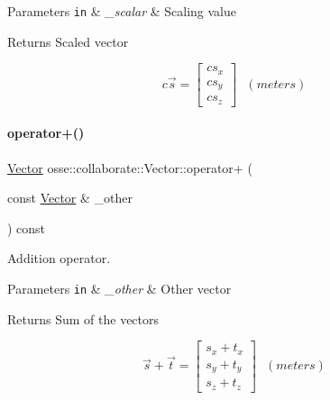 \begin{DoxyParams}[1]{Parameters}
\mbox{\tt in}  & {\em \+\_\+scalar} & Scaling value \\
\hline
\end{DoxyParams}
\begin{DoxyReturn}{Returns}
Scaled vector
\end{DoxyReturn}
\[ c\vec{s}=\begin{bmatrix}c s_x\\c s_y\\c s_z\end{bmatrix}~~~(meters) \] \mbox{\label{classosse_1_1collaborate_1_1_vector_aab7a37d0c9d6af906635510b15063cac}} 
\paragraph{\texorpdfstring{operator+()}{operator+()}}
{\footnotesize\ttfamily \hyperlink{classosse_1_1collaborate_1_1_vector}{Vector} osse\+::collaborate\+::\+Vector\+::operator+ (\begin{DoxyParamCaption}\item[{const \hyperlink{classosse_1_1collaborate_1_1_vector}{Vector} \&}]{\+\_\+other }\end{DoxyParamCaption}) const\hspace{0.3cm}{\ttfamily [inline]}}



Addition operator. 


\begin{DoxyParams}[1]{Parameters}
\mbox{\tt in}  & {\em \+\_\+other} & Other vector \\
\hline
\end{DoxyParams}
\begin{DoxyReturn}{Returns}
Sum of the vectors
\end{DoxyReturn}
\[ \vec{s} + \vec{t} = \begin{bmatrix} s_x + t_x \\ s_y + t_y \\ s_z + t_z \end{bmatrix} ~~~(meters) \] \mbox{\label{classosse_1_1collaborate_1_1_vector_a7d9cb2cd1fdeaae594569c3f8886a17c}} 

